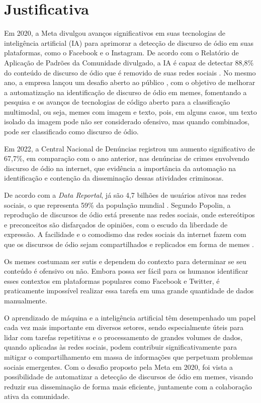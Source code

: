 \section{Justificativa}

Em 2020, a Meta divulgou avanços significativos em suas tecnologias de inteligência artificial (IA) para aprimorar a detecção de discurso de ódio em suas plataformas, como o Facebook e o Instagram. De acordo com o Relatório de Aplicação de Padrões da Comunidade divulgado, a IA é capaz de detectar 88,8\% do conteúdo de discurso de ódio que é removido de suas redes sociais \cite{MetaAIAdvances2020}. No mesmo ano, a empresa lançou um desafio aberto ao público \cite{hatefulmemes2020}, com o objetivo de melhorar a automatização na identificação de discurso de ódio em memes, fomentando a pesquisa e os avanços de tecnologias de código aberto para a classificação multimodal, ou seja, memes com imagem e texto, pois, em alguns casos, um texto isolado da imagem pode não ser considerado ofensivo, mas quando combinados, pode ser classificado como discurso de ódio.

Em 2022, a Central Nacional de Denúncias \cite{Safernet2022} registrou um aumento significativo de 67,7\%, em comparação com o ano anterior, nas denúncias de crimes envolvendo discurso de ódio na internet, que evidência a importância da automação na identificação e contenção da disseminação dessas atividades criminosas.

De acordo com a \textit{Data Reportal}, já são 4,7 bilhões de usuários ativos nas redes sociais, o que representa 59\% da população mundial \cite{DataReportal2022}. Segundo Popolin, a reprodução de discursos de ódio está presente nas redes sociais, onde estereótipos e preconceitos são disfarçados de opiniões, com o escudo da liberdade de expressão. A facilidade e o comodismo das redes sociais da internet fazem com que os discursos de ódio sejam compartilhados e replicados em forma de memes \cite{POPOLIN2018}.

Os memes costumam ser sutis e dependem do contexto para determinar se seu conteúdo é ofensivo ou não. Embora possa ser fácil para os humanos identificar esses contextos em plataformas populares como Facebook e Twitter, é praticamente impossível realizar essa tarefa em uma grande quantidade de dados manualmente. 

O aprendizado de máquina e a inteligência artificial têm desempenhado um papel cada vez mais importante em diversos setores, sendo especialmente úteis para lidar com tarefas repetitivas e o processamento de grandes volumes de dados, quando aplicadas às redes sociais, podem contribuir significativamente para mitigar o compartilhamento em massa de informações que perpetuam problemas sociais emergentes. Com o desafio proposto pela Meta em 2020, foi vista a possibilidade de automatizar a detecção de discursos de ódio em memes, visando reduzir sua disseminação de forma mais eficiente, juntamente com a colaboração ativa da comunidade.



